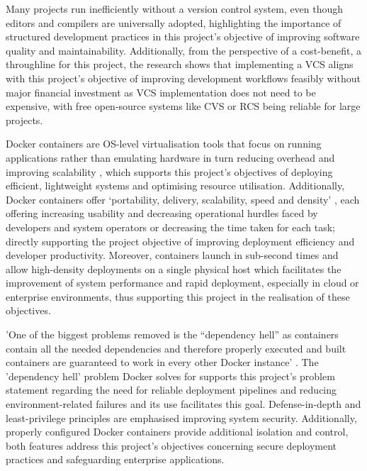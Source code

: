 \documentclass{report}
\begin{document}
Many projects run inefficiently without a version control system, even though editors and compilers are universally adopted, highlighting the importance of structured development practices in this project's objective of improving software quality and maintainability. Additionally, from the perspective of a cost-benefit, a throughline for this project, the research shows that implementing a VCS aligns with this project's objective of improving development workflows feasibly without major financial investment as VCS implementation does not need to be expensive, with free open-source systems like CVS or RCS being reliable for large projects.

Docker containers are OS-level virtualisation tools that focus on running applications rather than emulating hardware in turn reducing overhead and improving scalability \parencite{vaseAdvantagesDocker2015} , which supports this project's objectives of deploying efficient, lightweight systems and optimising resource utilisation. Additionally, Docker containers offer `portability, delivery, scalability, speed and density' \parencite{vaseAdvantagesDocker2015}, each offering increasing usability and decreasing operational hurdles faced by developers and system operators or decreasing the time taken for each task; directly supporting the project objective of improving deployment efficiency and developer productivity. Moreover, containers launch in sub-second times and allow high-density deployments on a single physical host \parencite{vaseAdvantagesDocker2015} which facilitates the improvement of system performance and rapid deployment, especially in cloud or enterprise environments, thus supporting this project in the realisation of these objectives.

'One of the biggest problems removed is the “dependency hell” as containers contain all the needed dependencies and therefore properly executed and built containers are guaranteed to work in every other Docker instance' \parencite{vaseAdvantagesDocker2015}. The 'dependency hell' problem Docker solves for supports this project's problem statement regarding the need for reliable deployment pipelines and reducing environment-related failures and its use facilitates this goal. Defense-in-depth and least-privilege principles are emphasised improving system security. Additionally, properly configured Docker containers provide additional isolation and control, both features address this project's objectives concerning secure deployment practices and safeguarding enterprise applications.
\end{document}
